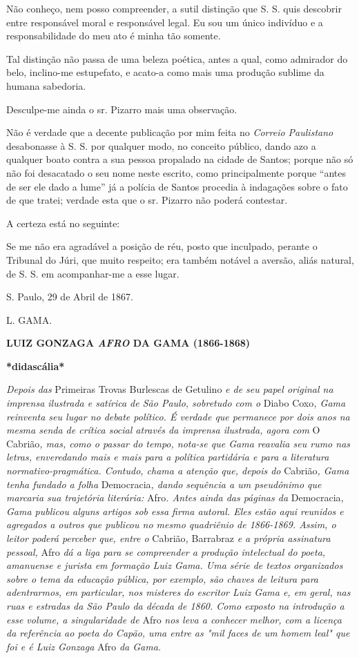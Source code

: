 Não conheço, nem posso compreender, a sutil distinção que S. S. quis
descobrir entre responsável moral e responsável legal. Eu sou um único
indivíduo e a responsabilidade do meu ato é minha tão somente.

Tal distinção não passa de uma beleza poética, antes a qual, como
admirador do belo, inclino-me estupefato, e acato-a como mais uma
produção sublime da humana sabedoria.

Desculpe-me ainda o sr. Pizarro mais uma observação.

Não é verdade que a decente publicação por mim feita no \emph{Correio
Paulistano} desabonasse à S. S. por qualquer modo, no conceito público,
dando azo a qualquer boato contra a sua pessoa propalado na cidade de
Santos; porque não só não foi desacatado o seu nome neste escrito, como
principalmente porque ``antes de ser ele dado a lume'' já a polícia de
Santos procedia à indagações sobre o fato de que tratei; verdade esta
que o sr. Pizarro não poderá contestar.

A certeza está no seguinte:

Se me não era agradável a posição de réu, posto que inculpado, perante o
Tribunal do Júri, que muito respeito; era também notável a aversão,
aliás natural, de S. S. em acompanhar-me a esse lugar.

S. Paulo, 29 de Abril de 1867.

L. GAMA.

\textbf{LUIZ GONZAGA \emph{AFRO} DA GAMA (1866-1868)}

\textbf{*didascália*}

\emph{Depois das} Primeiras Trovas Burlescas de Getulino \emph{e de seu
papel original na imprensa ilustrada e satírica de São Paulo, sobretudo
com o} Diabo Coxo\emph{, Gama reinventa seu lugar no debate político. É
verdade que permanece por dois anos na mesma senda de crítica social
através da imprensa ilustrada, agora com} O Cabrião\emph{, mas, como o
passar do tempo, nota-se que Gama reavalia seu rumo nas letras,
enveredando mais e mais para a política partidária e para a literatura
normativo-pragmática. Contudo, chama a atenção que, depois do}
Cabrião\emph{, Gama tenha fundado a folha} Democracia\emph{, dando
sequência a um pseudônimo que marcaria sua trajetória literária:}
Afro\emph{. Antes ainda das páginas da} Democracia\emph{, Gama publicou
alguns artigos sob essa firma autoral. Eles estão aqui reunidos e
agregados a outros que publicou no mesmo quadriênio de 1866-1869. Assim,
o leitor poderá perceber que, entre o} Cabrião\emph{,} Barrabraz \emph{e
a própria assinatura pessoal,} Afro \emph{dá a liga para se compreender
a produção intelectual do poeta, amanuense e jurista em formação Luiz
Gama. Uma série de textos organizados sobre o tema da educação pública,
por exemplo, são chaves de leitura para adentrarmos, em particular, nos
misteres do escritor Luiz Gama e, em geral, nas ruas e estradas da São
Paulo da década de 1860. Como exposto na introdução a esse volume, a
singularidade de} Afro \emph{nos leva a conhecer melhor, com a licença
da referência ao poeta do Capão, uma entre as "mil faces de um homem
leal" que foi e é Luiz Gonzaga} Afro \emph{da Gama.}

